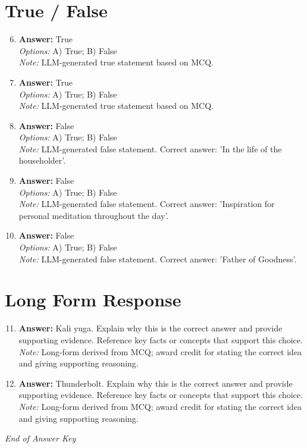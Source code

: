\documentclass[12pt]{article}
\begin{document}
\section*{True / False}
\begin{enumerate}[label=\arabic*.]
\setcounter{enumi}{5}
\item \textbf{Answer:} True
\\ \textit{Options:} A) True; B) False
\\ \textit{Note:} LLM-generated true statement based on MCQ.
\item \textbf{Answer:} True
\\ \textit{Options:} A) True; B) False
\\ \textit{Note:} LLM-generated true statement based on MCQ.
\item \textbf{Answer:} False
\\ \textit{Options:} A) True; B) False
\\ \textit{Note:} LLM-generated false statement. Correct answer: 'In the life of the householder'.
\item \textbf{Answer:} False
\\ \textit{Options:} A) True; B) False
\\ \textit{Note:} LLM-generated false statement. Correct answer: 'Inspiration for personal meditation throughout the day'.
\item \textbf{Answer:} False
\\ \textit{Options:} A) True; B) False
\\ \textit{Note:} LLM-generated false statement. Correct answer: 'Father of Goodness'.
\end{enumerate}

\section*{Long Form Response}
\begin{enumerate}[label=\arabic*.]
\setcounter{enumi}{10}
\item \textbf{Answer:} Kali yuga. Explain why this is the correct answer and provide supporting evidence. Reference key facts or concepts that support this choice.
\\ \textit{Note:} Long-form derived from MCQ; award credit for stating the correct idea and giving supporting reasoning.
\item \textbf{Answer:} Thunderbolt. Explain why this is the correct answer and provide supporting evidence. Reference key facts or concepts that support this choice.
\\ \textit{Note:} Long-form derived from MCQ; award credit for stating the correct idea and giving supporting reasoning.
\end{enumerate}

\vfill
\noindent\textit{End of Answer Key}
\end{document}
